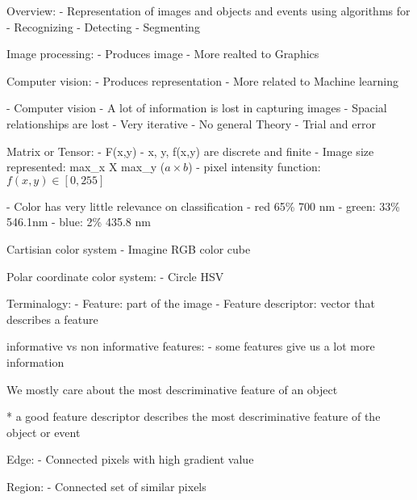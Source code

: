 Overview:
- Representation of images and objects and events using algorithms for
 - Recognizing
 - Detecting
 - Segmenting

Image processing:
 - Produces image
 - More realted to Graphics

Computer vision:
 - Produces representation
 - More related to Machine learning

- Computer vision
 - A lot of information is lost in capturing images
  - Spacial relationships are lost
 - Very iterative
 - No general Theory
 - Trial and error

Matrix or Tensor:
 - F(x,y)
 - x, y, f(x,y) are discrete and finite
 - Image size represented: max_x X max_y ($a \times b$)
 - pixel intensity function: $f(x,y) \in [0,255]$

- Color has very little relevance on classification
- red 65\% 700 nm
- green: 33\% 546.1nm
- blue: 2\% 435.8 nm

Cartisian color system
- Imagine RGB color cube

Polar coordinate color system:
- Circle HSV

Terminalogy:
- Feature: part of the image
- Feature descriptor: vector that describes a feature

informative vs non informative features:
- some features give us a lot more information

We mostly care about the most descriminative feature of an object

* a good feature descriptor describes the most descriminative feature of the object or event

Edge:
 - Connected pixels with high gradient value

Region:
 - Connected set of similar pixels
